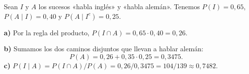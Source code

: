 Sean $I$ y $A$ los sucesos «habla inglés» y «habla alemán». Tenemos $P(I)=0{,}65$, $P(A\mid I)=0{,}40$ y $P(A\mid I^c)=0{,}25$.

\textbf{a)} Por la regla del producto, $P(I\cap A)=0{,}65\cdot0{,}40=\boxed{0{,}26}$.

\textbf{b)} Sumamos los dos caminos disjuntos que llevan a hablar alemán:
\[
P(A)=0{,}26+0{,}35\cdot0{,}25=\boxed{0{,}3475}.
\]
\textbf{c)} $P(I\mid A)=P(I\cap A)/P(A)=0{,}26/0{,}3475=\boxed{104/139}\approx0{,}7482$.
